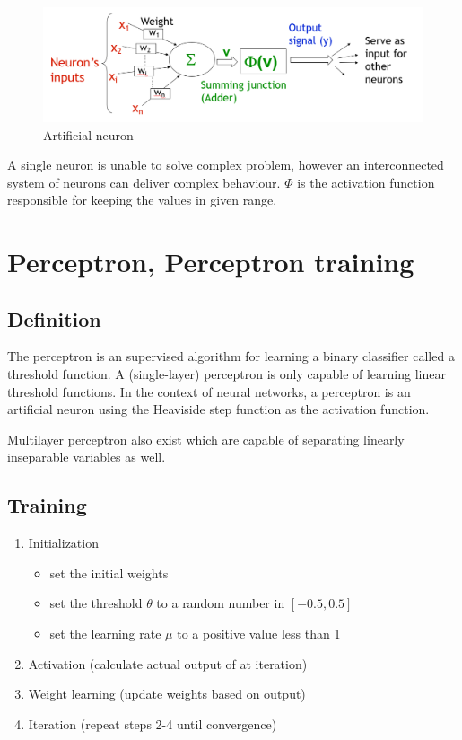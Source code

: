 \documentclass[a4paper,12pt,answers]{article}
\begin{document}
	\begin{figure}[H]
		\centering
		\includegraphics[width=0.7\linewidth]{artifical_neuron}
		\caption{Artificial neuron}
		\label{fig:artificalneuron}
	\end{figure}
	
	A single neuron is unable to solve complex problem, however an interconnected system of neurons can deliver complex behaviour. $\Phi$ is the activation function responsible for keeping the values in given range.
	
	\section{Perceptron, Perceptron training}
	\subsection{Definition}
	The perceptron is an supervised algorithm for learning a binary classifier called a threshold function. A (single-layer) perceptron is only capable of learning linear threshold functions. In the context of neural networks, a  perceptron is an artificial neuron using the Heaviside step function as the activation function. 
	
	Multilayer perceptron also exist which are capable of separating linearly inseparable variables as well.
	
	
	\subsection{Training}
	
	\begin{enumerate}
		\item Initialization
		\begin{itemize}
			\item set the initial weights
			\item set the threshold $\theta$ to a random number in $\left[ -0.5, 0.5 \right] $
			\item set the learning rate $\mu$ to a positive value less than 1
		\end{itemize}
		\item Activation (calculate actual output of at iteration)
		\item Weight learning (update weights based on output)
		\item Iteration (repeat steps 2-4 until convergence)
	\end{enumerate}
	
\end{document}
